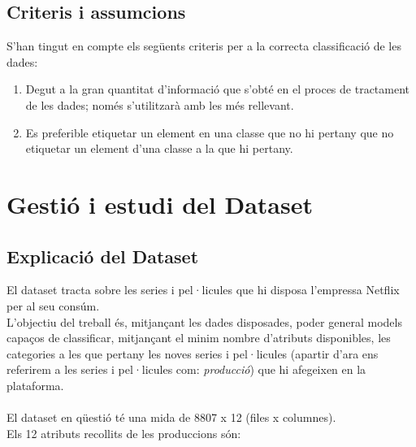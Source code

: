 \documentclass[a4paper, 11pt]{article}
\begin{document}
\subsection{Criteris i assumcions}
S'han tingut en compte els següents criteris per a la correcta classificació de les dades:
\begin{enumerate}
    \item Degut a la gran quantitat d'informació que s'obté en el proces de tractament de les dades; només s'utilitzarà amb les més rellevant.
    \item Es preferible etiquetar un element en una classe que no hi pertany que no etiquetar un element d'una classe a la que hi pertany.
\end{enumerate}

\newpage
\section{Gestió i estudi del Dataset}
\subsection{Explicació del Dataset} \label{exp_dataset}
El dataset tracta sobre les series i pel·licules que hi disposa l'empressa Netflix per al seu consúm. \\
L'objectiu del treball és, mitjançant les dades disposades, poder general models capaços de classificar, mitjançant el minim nombre d'atributs disponibles, les categories a les que pertany les noves series i pel·licules
(apartir d'ara ens referirem a les series i pel·licules com: \textit{producció})  que hi afegeixen en la plataforma.\\\\
El dataset en qüestió té una mida de 8807 x 12 (files x columnes). \\
Els 12 atributs recollits de les produccions són:
\end{document}
